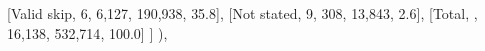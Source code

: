\documentclass[
  11pt,
  a4paper,
]{article}
\newenvironment{Shaded}{\begin{snugshade}}{\end{snugshade}}
\newcommand{\NormalTok}[1]{\textcolor[rgb]{0.00,0.23,0.31}{#1}}
\newcommand{\StringTok}[1]{\textcolor[rgb]{0.13,0.47,0.30}{#1}}
\begin{document}
\begin{Shaded}
\begin{Highlighting}[]
\NormalTok{            [}\StringTok{\textquotesingle{}Valid skip\textquotesingle{}}\NormalTok{, }\StringTok{\textquotesingle{}6\textquotesingle{}}\NormalTok{, }\StringTok{\textquotesingle{}6,127\textquotesingle{}}\NormalTok{, }\StringTok{\textquotesingle{}190,938\textquotesingle{}}\NormalTok{, }\StringTok{\textquotesingle{}35.8\textquotesingle{}}\NormalTok{],}
\NormalTok{            [}\StringTok{\textquotesingle{}Not stated\textquotesingle{}}\NormalTok{, }\StringTok{\textquotesingle{}9\textquotesingle{}}\NormalTok{, }\StringTok{\textquotesingle{}308\textquotesingle{}}\NormalTok{, }\StringTok{\textquotesingle{}13,843\textquotesingle{}}\NormalTok{, }\StringTok{\textquotesingle{}2.6\textquotesingle{}}\NormalTok{],}
\NormalTok{            [}\StringTok{\textquotesingle{}Total\textquotesingle{}}\NormalTok{, }\StringTok{\textquotesingle{}\textquotesingle{}}\NormalTok{, }\StringTok{\textquotesingle{}16,138\textquotesingle{}}\NormalTok{, }\StringTok{\textquotesingle{}532,714\textquotesingle{}}\NormalTok{, }\StringTok{\textquotesingle{}100.0\textquotesingle{}}\NormalTok{]}
\NormalTok{        ]}
\NormalTok{    ),}


\end{Highlighting}
\end{Shaded}
\end{document}
